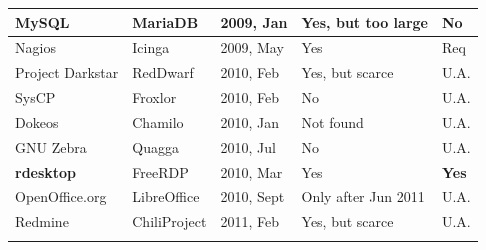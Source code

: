 \documentclass[11pt]{report}
\begin{document}
\begin{table}
\begin{tabular}{m{} m{} m{} m{} m{}}
MySQL & MariaDB & 2009, Jan & Yes, but too large & No\\ \hline
Nagios & Icinga & 2009, May & Yes & Req \\ \hline
Project Darkstar& RedDwarf & 2010, Feb & Yes, but scarce & U.A. \\ \hline
SysCP & Froxlor & 2010, Feb & No & U.A. \\ \hline
Dokeos & Chamilo & 2010, Jan & Not found & U.A. \\ \hline
GNU Zebra & Quagga & 2010, Jul & No & U.A. \\ \hline
\textbf{rdesktop} & FreeRDP & 2010, Mar & Yes & \textbf{Yes} \\ \hline
OpenOffice.org & LibreOffice & 2010, Sept & Only after Jun 2011 & U.A. \\ \hline
Redmine & ChiliProject & 2011, Feb & Yes, but scarce & U.A. \\
\noalign{\smallskip}\hline
\end{tabular}
\end{table}
\end{document}
